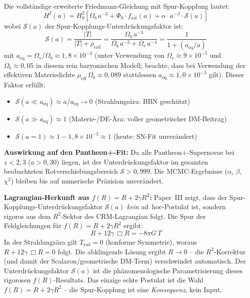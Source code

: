 \documentclass[aps,prd,twocolumn,superscriptaddress,nofootinbib]{revtex4-2}
\begin{document}
Die vollst\"andige erweiterte Friedmann-Gleichung mit Spur-Kopplung lautet:
\begin{equation}
{H^2(a) = H_0^2 \left[\Omega_b\,a^{-3} + \Phi_0 \cdot f_{\mathrm{sat}}(a) + \alpha \cdot a^{-\beta} \cdot \mathcal{S}(a)\right]}
\label{eq:extended_cfm_trace}
\end{equation}
wobei $\mathcal{S}(a)$ der Spur-Kopplungs-Unterdr\"uckungsfaktor ist:
\begin{equation}
\mathcal{S}(a) = \frac{|T|}{|T| + \rho_{\mathrm{rad}}} = \frac{\Omega_b\,a^{-3}}{\Omega_b\,a^{-3} + \Omega_r\,a^{-4}}
= \frac{1}{1 + (a_{\mathrm{eq}}/a)}
\label{eq:suppression}
\end{equation}
mit $a_{\mathrm{eq}} = \Omega_r/\Omega_b \approx 1{,}8 \times 10^{-3}$ (unter Verwendung von $\Omega_r \approx 9 \times 10^{-5}$ und $\Omega_b \approx 0{,}05$ in diesem rein baryonischen Modell; beachte, dass bei Verwendung der effektiven Materiedichte $\mu_{\mathrm{eff}}\,\Omega_b \approx 0{,}089$ stattdessen $a_{\mathrm{eq}} \approx 1{,}0 \times 10^{-3}$ gilt). Dieser Faktor erf\"ullt:
\begin{itemize}
\item $\mathcal{S}(a \ll a_{\mathrm{eq}}) \approx a/a_{\mathrm{eq}} \to 0$ \quad (Strahlungs\"ara: BBN gesch\"utzt)
\item $\mathcal{S}(a \gg a_{\mathrm{eq}}) \approx 1$ \quad (Materie-/DE-\"Ara: voller geometrischer DM-Beitrag)
\item $\mathcal{S}(a = 1) \approx 1 - 1{,}8\times10^{-3} \approx 1$ \quad (heute: SN-Fit unver\"andert)
\end{itemize}

\textbf{Auswirkung auf den Pantheon+-Fit:} Da alle Pantheon+-Supernovae bei $z < 2{,}3$ ($a > 0{,}30$) liegen, ist der Unterdr\"uckungsfaktor im gesamten beobachteten Rotverschiebungsbereich $\mathcal{S} > 0{,}999$. Die MCMC-Ergebnisse ($\alpha$, $\beta$, $\chi^2$) bleiben bis auf numerische Pr\"azision unver\"andert.

\textbf{Lagrangian-Herkunft aus $f(R) = R + 2\gamma R^2$:} Paper~III \cite{Geiger2026c} zeigt, dass der Spur-Kopplungs-Unterdr\"uckungsfaktor $\mathcal{S}(a)$ \textit{kein} ad~hoc-Postulat ist, sondern rigoros aus dem $R^2$-Sektor des CRM-Lagrangian folgt. Die Spur der Feldgleichungen f\"ur $f(R) = R + 2\gamma R^2$ ergibt:
\begin{equation}
R + 12\gamma\,\Box R = -8\pi G\,T
\end{equation}
In der Strahlungs\"ara gilt $T_{\mathrm{rad}} = 0$ (konforme Symmetrie), woraus $R + 12\gamma\,\Box R = 0$ folgt. Die abklingende L\"osung ergibt $R \to 0$ -- die $R^2$-Korrektur (und damit der Scalaron/geometrische DM-Term) verschwindet automatisch. Der Unterdr\"uckungsfaktor $\mathcal{S}(a)$ ist die ph\"anomenologische Parametrisierung dieses rigorosen $f(R)$-Resultats. Das einzige echte Postulat ist die Wahl $f(R) = R + 2\gamma R^2$ -- die Spur-Kopplung ist eine \textit{Konsequenz}, kein Input.
\end{document}
